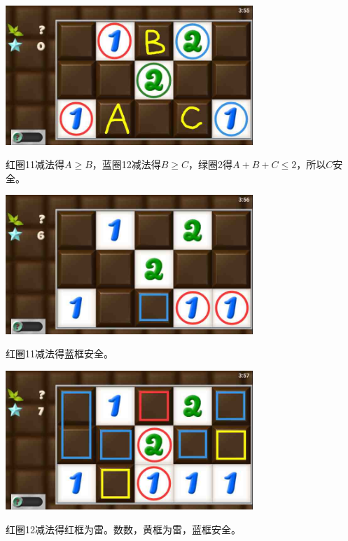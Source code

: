 \subsection{} %
\begin{center}
    \includegraphics[width=0.7\textwidth]{puzzlelow/98-1.jpg}
\end{center}
红圈11减法得$A\ge B$，蓝圈12减法得$B\ge C$，绿圈2得$A+B+C\le 2$，所以$C$安全。
\begin{center}
    \includegraphics[width=0.7\textwidth]{puzzlelow/98-2.jpg}
\end{center}
红圈11减法得蓝框安全。
\begin{center}
    \includegraphics[width=0.7\textwidth]{puzzlelow/98-3.jpg}
\end{center}
红圈12减法得红框为雷。数数，黄框为雷，蓝框安全。

